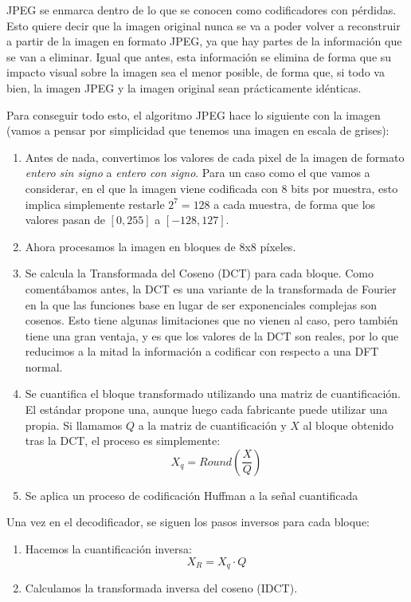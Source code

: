 \documentclass[es,practica]{uah}
\begin{document}
JPEG se enmarca dentro de lo que se conocen como codificadores con pérdidas. Esto quiere decir que la imagen original nunca se va a poder volver a reconstruir a partir de la imagen en formato JPEG, ya que hay partes de la información que se van a eliminar. Igual que antes, esta información se elimina de forma que su impacto visual sobre la imagen sea el menor posible, de forma que, si todo va bien, la imagen JPEG y la imagen original sean prácticamente idénticas. 

Para conseguir todo esto, el algoritmo JPEG hace lo siguiente con la imagen (vamos a pensar por simplicidad que tenemos una imagen en escala de grises):

\begin{enumerate}
\item Antes de nada, convertimos los valores de cada pixel de la imagen de formato \emph{entero sin signo} a \emph{entero con signo}. Para un caso como el que vamos a considerar, en el que la imagen viene codificada con 8 bits por muestra, esto implica simplemente restarle $2^7 = 128$ a cada muestra, de forma que los valores pasan de $[0, 255]$ a $[-128, 127]$.
\item Ahora procesamos la imagen en bloques de 8x8 píxeles.
\item Se calcula la Transformada del Coseno (DCT) para cada bloque. Como comentábamos antes, la DCT es una variante de la transformada de Fourier en la que las funciones base en lugar de ser exponenciales complejas son cosenos. Esto tiene algunas limitaciones que no vienen al caso, pero también tiene una gran ventaja, y es que los valores de la DCT son reales, por lo que reducimos a la mitad la información a codificar con respecto a una DFT normal.
\item Se cuantifica el bloque transformado utilizando una matriz de cuantificación. El estándar propone una, aunque luego cada fabricante puede utilizar una propia. Si llamamos $Q$ a la matriz de cuantificación y $X$ al bloque obtenido tras la DCT, el proceso es simplemente:
\begin{equation}
	X_q = Round \left ( \frac{X}{Q} \right )
\end{equation}
\item Se aplica un proceso de codificación Huffman a la señal cuantificada
\end{enumerate}

Una vez en el decodificador, se siguen los pasos inversos para cada bloque:

\begin{enumerate}
\item Hacemos la cuantificación inversa:
\begin{equation}
	X_R = X_q \cdot Q
\end{equation}
\item Calculamos la transformada inversa del coseno (IDCT).
\end{enumerate}
\end{document}
